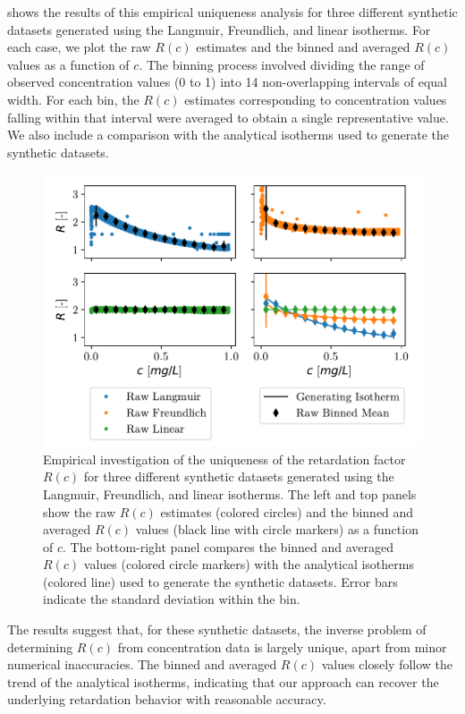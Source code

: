  shows the results of this empirical uniqueness analysis for three different synthetic datasets generated using the Langmuir, Freundlich, and linear isotherms. For each case, we plot the raw $R(c)$ estimates and the binned and averaged $R(c)$ values as a function of $c$. The binning process involved dividing the range of observed concentration values (0 to 1) into 14 non-overlapping intervals of equal width. For each bin, the $R(c)$ estimates corresponding to concentration values falling within that interval were averaged to obtain a single representative value. We also include a comparison with the analytical isotherms used to generate the synthetic datasets.

\begin{figure}[h!]
    \centering
    \includegraphics{figs/ret_uniqueness.pdf}
    \caption{Empirical investigation of the uniqueness of the retardation factor $R(c)$ for three different synthetic datasets generated using the Langmuir, Freundlich, and linear isotherms. The left and top panels show the raw $R(c)$ estimates (colored circles) and the binned and averaged $R(c)$ values (black line with circle markers) as a function of $c$. The bottom-right panel compares the binned and averaged $R(c)$ values (colored circle markers) with the analytical isotherms (colored line) used to generate the synthetic datasets. Error bars indicate the standard deviation within the bin.}
    \label{fig:ret_uniqueness}
\end{figure}

The results suggest that, for these synthetic datasets, the inverse problem of determining $R(c)$ from concentration data is largely unique, apart from minor numerical inaccuracies. The binned and averaged $R(c)$ values closely follow the trend of the analytical isotherms, indicating that our approach can recover the underlying retardation behavior with reasonable accuracy.

